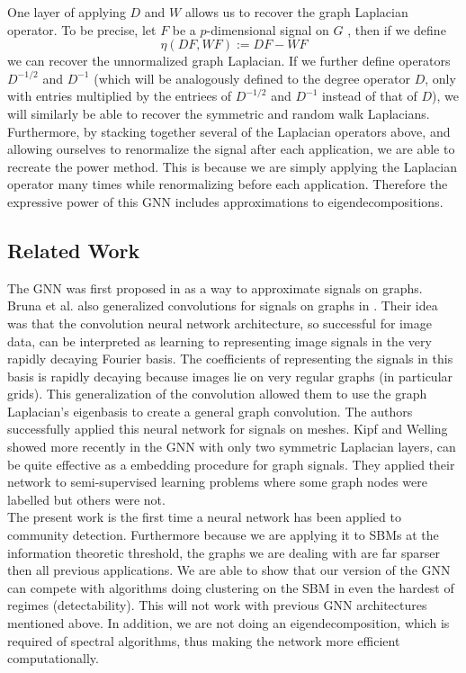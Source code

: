 One layer of applying $D$ and $W$ allows us to recover the graph Laplacian operator.  To be precise, let $F$ be a $p$-dimensional signal on $G$ , then if we define $$ \eta(DF, WF) := DF - WF$$ we can recover the unnormalized graph Laplacian.  If we further define operators $D^{-1/2}$ and $D^{-1}$ (which will be analogously defined to the degree operator $D$, only with entries multiplied by the entriees of $D^{-1/2}$ and $D^{-1}$ instead of that of $D$), we will similarly be able to recover the symmetric and random walk Laplacians.  Furthermore, by stacking together several of the Laplacian operators above, and allowing ourselves to renormalize the signal after each application, we are able to recreate the power method. This is because we are simply applying the Laplacian operator many times while renormalizing before each application. Therefore the expressive power of this GNN includes approximations to eigendecompositions.\\

\subsection{Related Work}
The GNN was first proposed in \cite{GNN} as a way to approximate signals on graphs. Bruna et al. also generalized convolutions for signals on graphs in \cite{Bruna}.  Their idea was that the convolution neural network architecture, so successful for image data, can be interpreted as learning to representing image signals in the very rapidly decaying Fourier basis.  The coefficients of representing the signals in this basis is rapidly decaying because images lie on very regular graphs (in particular grids). This generalization of the convolution allowed them to use the graph Laplacian's eigenbasis to create a general graph convolution.  The authors successfully applied this neural network for signals on meshes.  Kipf and Welling showed more recently in \cite{kipf2016semi} the GNN with only two symmetric Laplacian layers, can be quite effective as a embedding procedure for graph signals.  They applied their network to semi-supervised learning problems where some graph nodes were labelled but others were not.\\

The present work is the first time a neural network has been applied to community detection.  Furthermore because we are applying it to SBMs at the information theoretic threshold, the graphs we are dealing with are far sparser then all previous applications.   We are able to show that our version of the GNN can compete with algorithms doing  clustering on the SBM in even the hardest of regimes (detectability).  This will not work with previous GNN architectures mentioned above.  In addition, we are not doing an eigendecomposition, which is required of spectral algorithms, thus making the network more efficient computationally.  %



